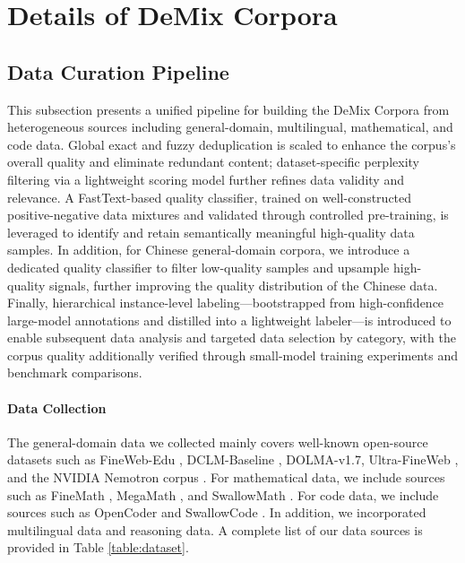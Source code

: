 
\section{Details of DeMix Corpora}
\label{appd:data_comp}

\subsection{Data Curation Pipeline}
This subsection presents a unified pipeline for building the DeMix Corpora from heterogeneous sources including general-domain, multilingual, mathematical, and code data. Global exact and fuzzy deduplication is scaled to enhance the corpus’s overall quality and eliminate redundant content; dataset-specific perplexity filtering via a lightweight scoring model further refines data validity and relevance. A FastText-based quality classifier, trained on well-constructed positive-negative data mixtures and validated through controlled pre-training, is leveraged to identify and retain semantically meaningful high-quality data samples. In addition, for Chinese general-domain corpora, we introduce a dedicated quality classifier to filter low-quality samples and upsample high-quality signals, further improving the quality distribution of the Chinese data. Finally, hierarchical instance-level labeling—bootstrapped from high-confidence large-model annotations and distilled into a lightweight labeler—is introduced to enable subsequent data analysis and targeted data selection by category, with the corpus quality additionally verified through small-model training experiments and benchmark comparisons.

\paragraph{Data Collection} The general-domain data we collected mainly covers well-known open-source datasets such as FineWeb-Edu \cite{penedo2024fineweb}, DCLM-Baseline \cite{li2024datacomp}, DOLMA-v1.7\cite{dolma}, Ultra-FineWeb \cite{wang2025ultra}, and the NVIDIA Nemotron corpus \cite{basant2025nvidia}. For mathematical data, we include sources such as FineMath \cite{liu2025finemath}, MegaMath \cite{zhou2025megamath}, and SwallowMath \cite{fujii2025rewriting}. For code data, we include sources such as OpenCoder \cite{huang2025opencoder} and SwallowCode \cite{fujii2025rewriting}. In addition, we incorporated multilingual data and reasoning data. A complete list of our data sources is provided in Table \ref{table:dataset}.

